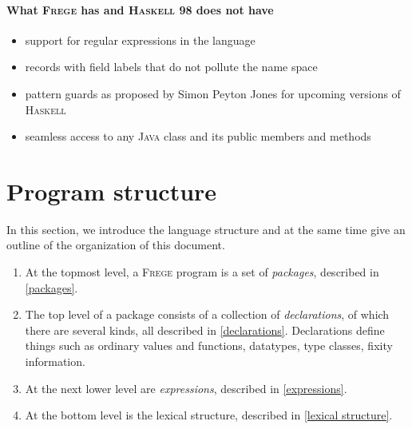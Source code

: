 \documentclass[a4paper,twocolumn,landscape]{report}
\newcommand{\haskell}[0]{\textsc{Haskell}}
\newcommand{\frege}[0]{\textsc{Frege}}
\newcommand{\java}{\textsc{Java}}
\begin{document}

\paragraph{What \frege{} has and \haskell{} 98 does not have}
\begin{itemize}
\item support for regular expressions in the language
\item records with field labels that do not pollute the name space
\item pattern guards as proposed by Simon Peyton Jones \cite{pguards}
for upcoming versions of \haskell{}
\item seamless access to any \java{} class and its public members and methods
\end{itemize}

\section{Program structure}

In this section, we introduce the language structure and at the
same time give an outline of the organization of this
document.

\begin{enumerate}

\item At the topmost level, a \frege{} program is a set of
\emph{packages}, described in \autoref{packages}.

\item The top level of a package consists of a collection of
\emph{declarations},
of which there are several kinds, all described in
\autoref{declarations}.
Declarations define things such as ordinary values and functions,
datatypes,
type classes, fixity information.

\item At the next lower level are \emph{expressions}, described in
\autoref{expressions}.

\item At the bottom level is the lexical structure, described in
\autoref{lexical structure}.

\end{enumerate}
\end{document}
